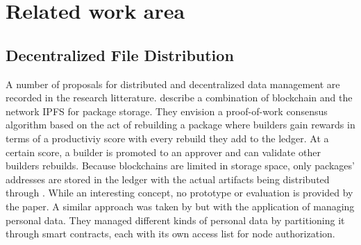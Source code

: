 \documentclass[english, biblatex, digitaloutput]{kththesis}
\begin{document}





\section{Related work area}

\subsection{Decentralized File Distribution}

A number of proposals for distributed and decentralized data management are recorded in the research litterature. \textcite{ince_blockchain_2020} describe a combination of blockchain and the  network \gls{IPFS} for package storage. They envision a proof-of-work consensus algorithm based on the act of rebuilding a package where builders gain rewards in terms of a productiviy score with every rebuild they add to the ledger. At a certain score, a builder is promoted to an approver and can validate other builders rebuilds. Because blockchains are limited in storage space, only packages' addresses are stored in the ledger with the actual artifacts being distributed through . While an interesting concept, no prototype or evaluation is provided by the paper. A similar approach was taken by \textcite{zichichi_efficiency_2020} but with the application of managing personal data. They managed different kinds of personal data by partitioning it through smart contracts, each with its own access list for node authorization.
\end{document}
